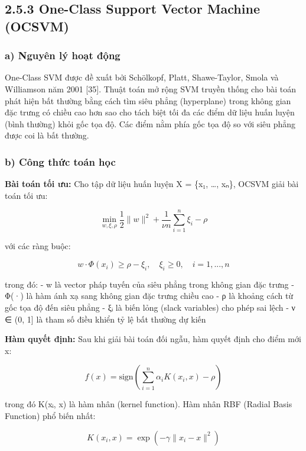 \documentclass[
  a4paper]{report}
\begin{document}
\subsection{2.5.3 One-Class Support Vector Machine
(OCSVM)}\label{one-class-support-vector-machine-ocsvm}

\subsubsection{a) Nguyên lý hoạt
động}\label{a-nguyuxean-luxfd-houx1ea1t-ux111ux1ed9ng-2}

One-Class SVM được đề xuất bởi Schölkopf, Platt, Shawe-Taylor, Smola và
Williamson năm 2001 {[}35{]}. Thuật toán mở rộng SVM truyền thống cho
bài toán phát hiện bất thường bằng cách tìm siêu phẳng (hyperplane)
trong không gian đặc trưng có chiều cao hơn sao cho tách biệt tối đa các
điểm dữ liệu huấn luyện (bình thường) khỏi gốc tọa độ. Các điểm nằm phía
gốc tọa độ so với siêu phẳng được coi là bất thường.

\subsubsection{b) Công thức toán
học}\label{b-cuxf4ng-thux1ee9c-touxe1n-hux1ecdc-2}

\textbf{Bài toán tối ưu:} Cho tập dữ liệu huấn luyện X = \{x₁, \ldots,
xₙ\}, OCSVM giải bài toán tối ưu:

\[\min_{w, \xi, \rho} \frac{1}{2}\|w\|^2 + \frac{1}{\nu n}\sum_{i=1}^{n}\xi_i - \rho\]

với các ràng buộc:

\[w \cdot \Phi(x_i) \geq \rho - \xi_i, \quad \xi_i \geq 0, \quad i = 1, ..., n\]

trong đó: - w là vector pháp tuyến của siêu phẳng trong không gian đặc
trưng - Φ(·) là hàm ánh xạ sang không gian đặc trưng chiều cao - ρ là
khoảng cách từ gốc tọa độ đến siêu phẳng - ξᵢ là biến lỏng (slack
variables) cho phép sai lệch - ν ∈ (0, 1{]} là tham số điều khiển tỷ lệ
bất thường dự kiến

\textbf{Hàm quyết định:} Sau khi giải bài toán đối ngẫu, hàm quyết định
cho điểm mới x:

\[f(x) = \text{sign}\left(\sum_{i=1}^{n} \alpha_i K(x_i, x) - \rho\right)\]

trong đó K(xᵢ, x) là hàm nhân (kernel function). Hàm nhân RBF (Radial
Basis Function) phổ biến nhất:

\[K(x_i, x) = \exp\left(-\gamma\|x_i - x\|^2\right)\]
\end{document}
